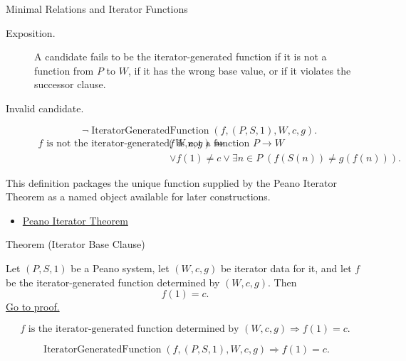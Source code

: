 \begin{topicbox}{Minimal Relations and Iterator Functions}
\begin{remark*}
\begin{description}
  \item[Exposition.]
  A candidate fails to be the iterator-generated function if it is not a
  function from $P$ to $W$, if it has the wrong base value, or if it violates
  the successor clause.
  \item[Invalid candidate.]
  \[
  \neg\operatorname{IteratorGeneratedFunction}(f,(P,S,1),W,c,g).
  \]
  \[
  \begin{aligned}
  f \text{ is not the iterator-generated function determined by } (W,c,g)
  \Longleftrightarrow\;&
  f \text{ is not a function } P\to W\\
  &\lor f(1)\neq c
  \lor \exists n\in P\;(f(S(n))\neq g(f(n))).
  \end{aligned}
  \]
\end{description}
\end{remark*}

\begin{remark*}[Interpretation]
This definition packages the unique function supplied by the Peano Iterator
Theorem as a named object available for later constructions.
\end{remark*}

\begin{dependencies}
\begin{itemize}
  \item \hyperref[thm:peano-iterator-theorem]{Peano Iterator Theorem}
\end{itemize}
\end{dependencies}

\begin{theorembox}{Theorem (Iterator Base Clause)}
\begin{theorem}
\label{thm:iterator-base-value}
Let $(P,S,1)$ be a Peano system, let $(W,c,g)$ be iterator data for it, and let
$f$ be the iterator-generated function determined by $(W,c,g)$. Then
\[
f(1)=c.
\]
\hyperref[prf:iterator-base-value]{Go to proof.}
\end{theorem}
\end{theorembox}

\begin{remark*}
\[
f \text{ is the iterator-generated function determined by } (W,c,g)
\Longrightarrow f(1)=c.
\]
\end{remark*}

\begin{remark*}
\[
\operatorname{IteratorGeneratedFunction}(f,(P,S,1),W,c,g)
\Longrightarrow f(1)=c.
\]
\end{remark*}




\end{topicbox}
